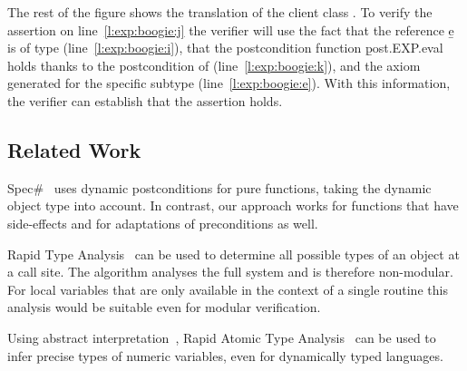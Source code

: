 The rest of the figure shows the translation of the client class . To verify the assertion on line~\ref{l:exp:boogie:j} the verifier will use the fact that the reference \b{e} is of type  (line~\ref{l:exp:boogie:i}), that the postcondition function \b{post.EXP.eval} holds thanks to the postcondition of  (line~\ref{l:exp:boogie:k}), and the axiom generated for the specific subtype (line~\ref{l:exp:boogie:e}). With this information, the verifier can establish that the assertion holds.


\subsection{Related Work}


Spec\#~\cite{BARNETT05} uses dynamic postconditions for pure functions, taking the dynamic object type into account. In contrast, our approach works for functions that have side-effects and for adaptations of preconditions as well.

Rapid Type Analysis~\cite{BACON96} can be used to determine all possible types of an object at a call site.
The algorithm analyses the full system and is therefore non-modular.
For local variables that are only available in the context of a single routine this analysis would be suitable even for modular verification.

Using abstract interpretation~\cite{COUSOT77}, Rapid Atomic Type Analysis~\cite{LOGOZZO10} can be used to infer precise types of numeric variables, even for dynamically typed languages.

